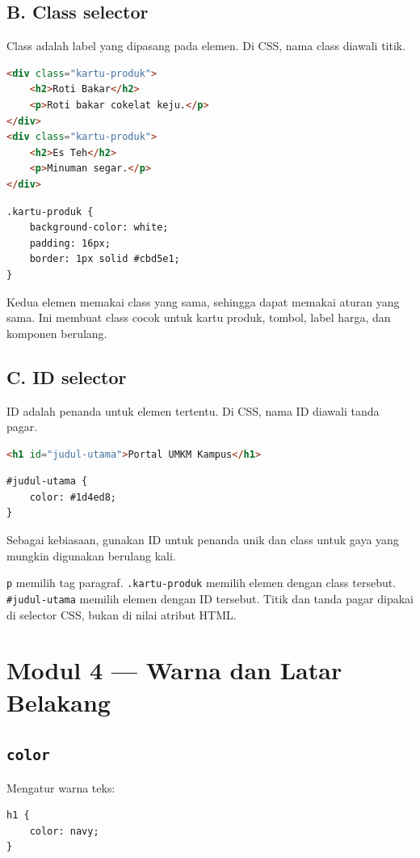 \documentclass[11pt,a4paper]{article}
\begin{document}
\subsection{B. Class selector}
Class adalah label yang dipasang pada elemen. Di CSS, nama class diawali titik.
\begin{lstlisting}[language=HTML]
<div class="kartu-produk">
    <h2>Roti Bakar</h2>
    <p>Roti bakar cokelat keju.</p>
</div>
<div class="kartu-produk">
    <h2>Es Teh</h2>
    <p>Minuman segar.</p>
</div>
\end{lstlisting}
\begin{lstlisting}
.kartu-produk {
    background-color: white;
    padding: 16px;
    border: 1px solid #cbd5e1;
}
\end{lstlisting}
Kedua elemen memakai class yang sama, sehingga dapat memakai aturan yang sama. Ini membuat class cocok untuk kartu produk, tombol, label harga, dan komponen berulang.

\subsection{C. ID selector}
ID adalah penanda untuk elemen tertentu. Di CSS, nama ID diawali tanda pagar.
\begin{lstlisting}[language=HTML]
<h1 id="judul-utama">Portal UMKM Kampus</h1>
\end{lstlisting}
\begin{lstlisting}
#judul-utama {
    color: #1d4ed8;
}
\end{lstlisting}
Sebagai kebiasaan, gunakan ID untuk penanda unik dan class untuk gaya yang mungkin digunakan berulang kali.

\begin{ingat}
\texttt{p} memilih tag paragraf. \texttt{.kartu-produk} memilih elemen dengan class tersebut. \texttt{\#judul-utama} memilih elemen dengan ID tersebut. Titik dan tanda pagar dipakai di selector CSS, bukan di nilai atribut HTML.
\end{ingat}

\section{Modul 4 --- Warna dan Latar Belakang}
\subsection{\texttt{color}}
Mengatur warna teks:
\begin{lstlisting}
h1 {
    color: navy;
}
\end{lstlisting}
\end{document}

